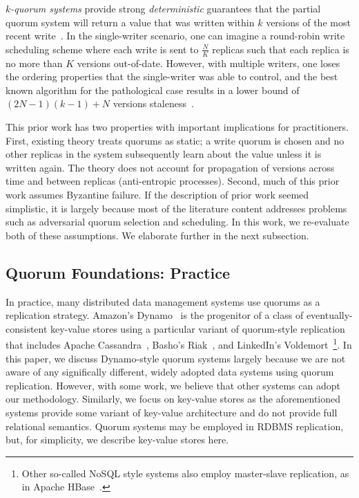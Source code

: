 \documentclass{vldb}
\begin{document}
\textit{$k$-quorum systems} provide strong \textit{deterministic}
guarantees that the partial quorum system will return a value that was
written within $k$ versions of the most recent
write~\cite{nonstrict-availability}.  In the single-writer scenario,
one can imagine a round-robin write scheduling scheme where each write
is sent to $\frac{N}{K}$ replicas such that each replica is no more
than $K$ versions out-of-date.  However, with multiple writers, one
loses the ordering properties that the single-writer was able to
control, and the best known algorithm for the pathological case
results in a lower bound of $(2N-1)(k-1)+N$ versions staleness~\cite{multi-k-quorum}.

This prior work has two properties with important implications for
practitioners.  First, existing theory treats quorums as static; a
write quorum is chosen and no other replicas in the system
subsequently learn about the value unless it is written again.  The
theory does not account for propagation of versions across time and
between replicas (anti-entropic processes).  Second, much of this
prior work assumes Byzantine failure.  If the description of prior
work seemed simplistic, it is largely because most of the literature
content addresses problems such as adversarial quorum selection and
scheduling.  In this work, we re-evaluate both of these assumptions.  We
elaborate further in the next subsection.

\subsection{Quorum Foundations: Practice}
\label{sec:practice}

In practice, many distributed data management systems use quorums as a
replication strategy. Amazon's Dynamo~\cite{dynamo} is the progenitor
of a class of eventually-consistent key-value stores using a
particular variant of quorum-style replication that includes Apache
Cassandra~\cite{cassandra, cassandra-sigmod}, Basho's Riak~\cite{riak}, and LinkedIn's Voldemort~\cite{voldemort, voldemortpub}\footnote{Other
  so-called NoSQL style systems also employ master-slave replication, as in Apache
  HBase~\cite{hbase}.}.  In this paper, we discuss Dynamo-style quorum
systems largely because we are not aware of any significally
different, widely adopted data systems using quorum replication.
However, with some work, we believe that other systems can adopt our
methodology.  Similarly, we focus on key-value stores as the
aforementioned systems provide some variant of key-value architecture
and do not provide full relational semantics.  Quorum systems may be
employed in RDBMS replication, but, for simplicity, we describe
key-value stores here.
\end{document}

